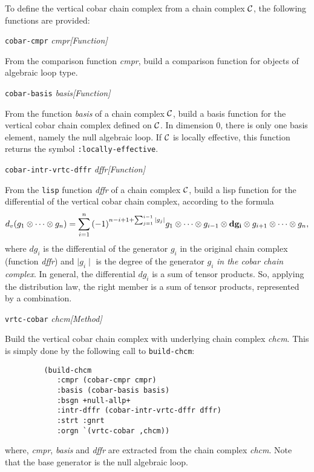 To define the vertical cobar chain complex 
from a chain complex ${\cal C}$, the following functions are provided:
\vskip 0.35cm
{\parindent=0mm
{\leftskip=5mm 
{\tt cobar-cmpr} {\em cmpr}\hfill {\em [Function]} \par}
{\leftskip=15mm 
From the comparison function {\em cmpr}, build a comparison function for objects
of algebraic loop type. \par}
{\leftskip=5mm 
{\tt cobar-basis} {\em basis}\hfill {\em [Function]} \par}
{\leftskip=15mm 
From the function {\em basis} of a  chain complex ${\cal C}$, build a basis
function for the vertical cobar chain complex defined on ${\cal C}$. In dimension $0$, there
is only one basis element, namely the null algebraic loop. If ${\cal C}$ is locally effective,
this function returns the symbol {\tt :locally-effective}. \par}
{\leftskip=5mm 
{\tt cobar-intr-vrtc-dffr} {\em dffr}\hfill {\em [Function]} \par}
{\leftskip=15mm 
From the {\tt lisp} function {\em dffr} of a chain complex  ${\cal C}$, build a 
lisp function for the differential of the vertical cobar chain complex, according to the formula
$$d_v(g_1 \otimes \cdots \otimes g_n)=
\sum_{i=1}^n{(-1)^{n-i+1+{\sum_{j=1}^{i-1}{\mid g_j \mid}}}
  g_1 \otimes \cdots \otimes g_{i-1} \otimes {\bf dg_i} \otimes g_{i+1} \otimes \cdots \otimes g_n},$$
where $dg_i$ is the differential of the generator $g_i$ in the original chain complex (function {\em dffr})
and $\mid g_i \mid$ is the degree of the generator $g_i$ {\em in the cobar chain complex}.
In general, the differential $dg_i$ is a sum of tensor products.
So, applying the distribution law, the right member is a sum of tensor products, represented by a combination. \par}
{\leftskip=5mm 
{\tt vrtc-cobar} {\em chcm}\hfill {\em [Method]} \par}
{\leftskip=15mm 
Build the vertical cobar chain complex with underlying chain complex {\em chcm}. This is simply done by the following
call to {\tt build-chcm}:
{\footnotesize\begin{verbatim}
         (build-chcm
            :cmpr (cobar-cmpr cmpr)
            :basis (cobar-basis basis)
            :bsgn +null-allp+
            :intr-dffr (cobar-intr-vrtc-dffr dffr)
            :strt :gnrt
            :orgn `(vrtc-cobar ,chcm))
\end{verbatim}}
where, {\em cmpr}, {\em basis} and {\em dffr} are extracted from the chain complex {\em chcm}. Note that
the base generator is the null algebraic loop. \par}
}

